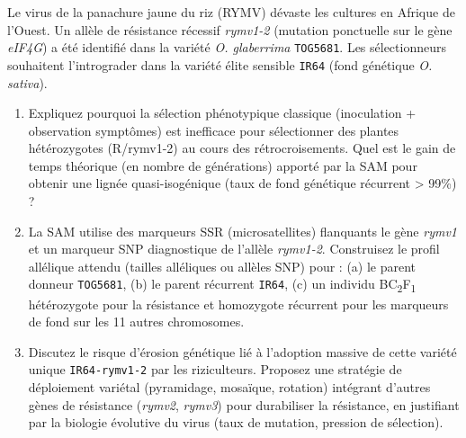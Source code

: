 \documentclass[11pt]{article}
\begin{document}
\begin{exercice}
Le virus de la panachure jaune du riz (RYMV) dévaste les cultures en Afrique de l'Ouest. Un allèle de résistance récessif \textit{rymv1-2} (mutation ponctuelle sur le gène \textit{eIF4G}) a été identifié dans la variété \textit{O. glaberrima} \texttt{TOG5681}. Les sélectionneurs souhaitent l'intrograder dans la variété élite sensible \texttt{IR64} (fond génétique \textit{O. sativa}).
\begin{enumerate}
    \item Expliquez pourquoi la sélection phénotypique classique (inoculation + observation symptômes) est inefficace pour sélectionner des plantes hétérozygotes (R/rymv1-2) au cours des rétrocroisements. Quel est le gain de temps théorique (en nombre de générations) apporté par la SAM pour obtenir une lignée quasi-isogénique (taux de fond génétique récurrent > 99\%) ?
    \item La SAM utilise des marqueurs SSR (microsatellites) flanquants le gène \textit{rymv1} et un marqueur SNP diagnostique de l'allèle \textit{rymv1-2}. Construisez le profil allélique attendu (tailles alléliques ou allèles SNP) pour : (a) le parent donneur \texttt{TOG5681}, (b) le parent récurrent \texttt{IR64}, (c) un individu BC\textsubscript{2}F\textsubscript{1} hétérozygote pour la résistance et homozygote récurrent pour les marqueurs de fond sur les 11 autres chromosomes.
    \item Discutez le risque d'érosion génétique lié à l'adoption massive de cette variété unique \texttt{IR64-rymv1-2} par les riziculteurs. Proposez une stratégie de déploiement variétal (pyramidage, mosaïque, rotation) intégrant d'autres gènes de résistance (\textit{rymv2}, \textit{rymv3}) pour durabiliser la résistance, en justifiant par la biologie évolutive du virus (taux de mutation, pression de sélection).
\end{enumerate}
\end{exercice}
\end{document}
